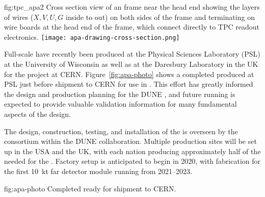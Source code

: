 \begin{dunefigure}{fig:tpc_apa2}
{Cross section view of an  frame near the head end showing the layers of wires ($X,V,U,G$ inside to out) on both sides of the frame and terminating on wire boards at the head end of the frame, which connect directly to TPC readout electronics.} 
\texttt{[image: apa-drawing-cross-section.png]} 
\end{dunefigure} 

Full-scale  have recently been produced at the Physical Sciences Laboratory (PSL) at the University of Wisconsin as well as at the Daresbury Laboratory in the UK for the  project at CERN. Figure~\ref{fig:apa-photo} shows a completed  produced at PSL just before shipment to CERN for use in . This effort has greatly informed the design and production planning for the DUNE , and future  running is expected to provide valuable validation information for many fundamental aspects of the   design. 

The design, construction, testing, and installation of the  is overseen by the  consortium within the DUNE collaboration. Multiple  production sites will be set up in the USA and the UK, with each nation producing approximately half of the  needed for the %
.  Factory setup is anticipated to begin in 2020, with  fabrication for the first \SI{10}{kt} far detector module running from 2021--2023.  

\begin{dunefigure}{fig:apa-photo}
{Completed   ready for shipment to CERN.}
\setlength{\fboxsep}{0pt}
\setlength{\fboxrule}{0.5pt}
\end{dunefigure}
